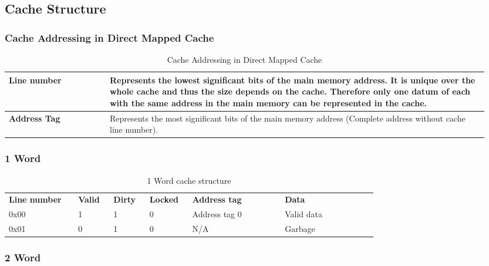 	\subsection{Cache Structure }
		\subsubsection{Cache Addressing in Direct Mapped Cache}
			\begin{table}[H]
				\centering
				\begin{tabular}{|p{0.2\linewidth}|p{0.75\linewidth}|}
					\hline
					\textbf{Line number}
						& Represents the lowest significant bits of the main memory address. It is unique over the whole cache and thus the size depends on the cache. Therefore only one datum of each with the same address in the main memory can be represented in the cache.\\
					\hline
					\textbf{Address Tag}
						& Represents the most significant bits of the main memory address (Complete address without cache line number).\\
					\hline
				\end{tabular}
				\caption{Cache Addressing in Direct Mapped Cache}
			\end{table} 
			
		\subsubsection {1 Word}
		
			\begin{table}[H]
				\centering
				\begin{tabular}{p{0.15\linewidth}|p{0.06\linewidth}|p{0.06\linewidth}|p{0.06\linewidth}|p{0.2\linewidth}|p{0.2\linewidth}|}
					\cline{2-6}
						\textbf{Line number}
							& \textbf{Valid}
							& \textbf{Dirty}
							& \textbf{Locked}
							& \textbf{Address tag}
							& \textbf{Data}\\
					\cline{2-6}
						0x00
							& 1
							& 1
							& 0
							& Address tag 0
							& Valid data\\
					\cline{2-6}
						0x01
							& 0
							& 1
							& 0
							& N/A
							& Garbage\\
					\cline{2-6}
				\end{tabular}
				\caption{1 Word cache structure}
			\end{table}	
			
		\subsubsection {2 Word}
		
